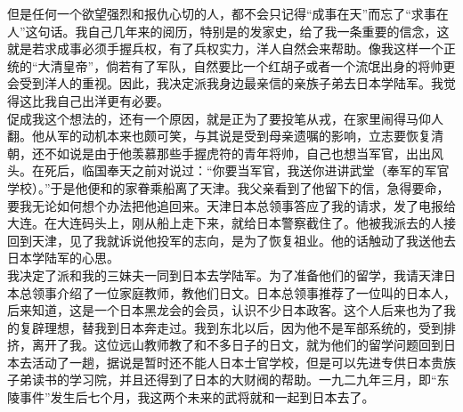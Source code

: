 但是任何一个欲望强烈和报仇心切的人，都不会只记得“成事在天”而忘了“求事在人”这句话。我自己几年来的阅历，特别是的发家史，给了我一条重要的信念，这就是若求成事必须手握兵权，有了兵权实力，洋人自然会来帮助。像我这样一个正统的“大清皇帝”，倘若有了军队，自然要比一个红胡子或者一个流氓出身的将帅更会受到洋人的重视。因此，我决定派我身边最亲信的亲族子弟去日本学陆军。我觉得这比我自己出洋更有必要。\\

促成我这个想法的，还有一个原因，就是正为了要投笔从戎，在家里闹得马仰人翻。他从军的动机本来也颇可笑，与其说是受到母亲遗嘱的影响，立志要恢复清朝，还不如说是由于他羡慕那些手握虎符的青年将帅，自己也想当军官，出出风头。在死后，临国奉天之前对说过：“你要当军官，我送你进讲武堂（奉军的军官学校）。”于是他便和的家眷乘船离了天津。我父亲看到了他留下的信，急得要命，要我无论如何想个办法把他追回来。天津日本总领事答应了我的请求，发了电报给大连。在大连码头上，刚从船上走下来，就给日本警察截住了。他被我派去的人接回到天津，见了我就诉说他投军的志向，是为了恢复祖业。他的话触动了我送他去日本学陆军的心思。\\

我决定了派和我的三妹夫一同到日本去学陆军。为了准备他们的留学，我请天津日本总领事介绍了一位家庭教师，教他们日文。日本总领事推荐了一位叫的日本人，后来知道，这是一个日本黑龙会的会员，认识不少日本政客。这个人后来也为了我的复辟理想，替我到日本奔走过。我到东北以后，因为他不是军部系统的，受到排挤，离开了我。这位远山教师教了和不多日子的日文，就为他们的留学问题回到日本去活动了一趟，据说是暂时还不能人日本士官学校，但是可以先进专供日本贵族子弟读书的学习院，并且还得到了日本的大财阀的帮助。一九二九年三月，即“东陵事件”发生后七个月，我这两个未来的武将就和一起到日本去了。
